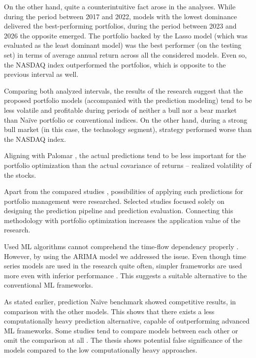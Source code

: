 On the other hand, quite a counterintuitive fact arose in the analyses. While during the period between 2017 and 2022, models with the lowest dominance delivered the best-performing portfolios, during the period between 2023 and 2026 the opposite
emerged. The portfolio backed by the Lasso model (which was evaluated as the least dominant model) was the best performer (on the testing set) in terms of average annual return across all the considered models. Even so, the NASDAQ index outperformed the portfolios, which is opposite
to the previous interval as well.

Comparing both analyzed intervals, the results of the research suggest that the proposed portfolio models (accompanied with the prediction modeling) tend to be less volatile and profitable during periods of neither a bull nor a bear market than Naïve portfolio or conventional indices. On the other hand, during a strong bull market (in this case, the technology segment),
strategy performed worse than the NASDAQ index.

Aligning with Palomar \cite{portfolio}, the actual predictions tend to be less important for the portfolio optimization than the actual covariance of returns -- realized volatility of the stocks.
\newline
\par
Apart from the compared studies \cite{krauss,konferencia1,zhao}, possibilities of applying such predictions for portfolio management were researched. Selected studies focused solely on designing the prediction pipeline and prediction evaluation. Connecting this methodology with portfolio optimization increases the application value of the research.

Used ML algorithms cannot comprehend the time-flow dependency properly \cite{forecast_book}. However, by using the ARIMA model we addressed the issue. Even though time series models are used in the research quite often, simpler frameworks are used more even with inferior performance \cite{review}. This suggests a suitable alternative to the conventional ML frameworks. 

As stated earlier, prediction Naïve benchmark showed competitive results, in comparison with the other models. This shows that there exists a less computationally heavy prediction alternative, capable of outperforming advanced ML frameworks. Some studies tend to compare models between each other \cite{mei2018stock} or omit the comparison at all \cite{zhao}. The thesis shows potential
false significance of the models compared to the low computationally heavy approaches. %

